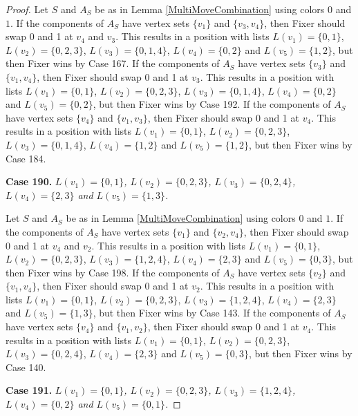 \documentclass[12pt]{amsart}
\theoremstyle{plain}
\theoremstyle{definition}
\theoremstyle{remark}
\begin{document}
\begin{proof}
Let $S$ and $A_S$ be as in Lemma \ref{MultiMoveCombination} using colors $0$ and $1$. If the components of $A_S$ have vertex sets $\{v_1\}$ and $\{v_3, v_4\}$, then Fixer should swap 0 and 1 at $v_4$ and $v_3$. This results in a position with lists $L(v_1) = \{0, 1\}$, $L(v_2) = \{0, 2, 3\}$, $L(v_3) = \{0, 1, 4\}$, $L(v_4) = \{0, 2\}$ and $L(v_5) = \{1, 2\}$, but then Fixer wins by Case 167.
If the components of $A_S$ have vertex sets $\{v_3\}$ and $\{v_1, v_4\}$, then Fixer should swap 0 and 1 at $v_3$. This results in a position with lists $L(v_1) = \{0, 1\}$, $L(v_2) = \{0, 2, 3\}$, $L(v_3) = \{0, 1, 4\}$, $L(v_4) = \{0, 2\}$ and $L(v_5) = \{0, 2\}$, but then Fixer wins by Case 192.
If the components of $A_S$ have vertex sets $\{v_4\}$ and $\{v_1, v_3\}$, then Fixer should swap 0 and 1 at $v_4$. This results in a position with lists $L(v_1) = \{0, 1\}$, $L(v_2) = \{0, 2, 3\}$, $L(v_3) = \{0, 1, 4\}$, $L(v_4) = \{1, 2\}$ and $L(v_5) = \{1, 2\}$, but then Fixer wins by Case 184.

\noindent\textbf{Case 190.  }\textit{$L(v_1) = \{0, 1\}$, $L(v_2) = \{0, 2, 3\}$, $L(v_3) = \{0, 2, 4\}$, $L(v_4) = \{2, 3\}$ and $L(v_5) = \{1, 3\}$.}

Let $S$ and $A_S$ be as in Lemma \ref{MultiMoveCombination} using colors $0$ and $1$. If the components of $A_S$ have vertex sets $\{v_1\}$ and $\{v_2, v_4\}$, then Fixer should swap 0 and 1 at $v_4$ and $v_2$. This results in a position with lists $L(v_1) = \{0, 1\}$, $L(v_2) = \{0, 2, 3\}$, $L(v_3) = \{1, 2, 4\}$, $L(v_4) = \{2, 3\}$ and $L(v_5) = \{0, 3\}$, but then Fixer wins by Case 198.
If the components of $A_S$ have vertex sets $\{v_2\}$ and $\{v_1, v_4\}$, then Fixer should swap 0 and 1 at $v_2$. This results in a position with lists $L(v_1) = \{0, 1\}$, $L(v_2) = \{0, 2, 3\}$, $L(v_3) = \{1, 2, 4\}$, $L(v_4) = \{2, 3\}$ and $L(v_5) = \{1, 3\}$, but then Fixer wins by Case 143.
If the components of $A_S$ have vertex sets $\{v_4\}$ and $\{v_1, v_2\}$, then Fixer should swap 0 and 1 at $v_4$. This results in a position with lists $L(v_1) = \{0, 1\}$, $L(v_2) = \{0, 2, 3\}$, $L(v_3) = \{0, 2, 4\}$, $L(v_4) = \{2, 3\}$ and $L(v_5) = \{0, 3\}$, but then Fixer wins by Case 140.

\noindent\textbf{Case 191.  }\textit{$L(v_1) = \{0, 1\}$, $L(v_2) = \{0, 2, 3\}$, $L(v_3) = \{1, 2, 4\}$, $L(v_4) = \{0, 2\}$ and $L(v_5) = \{0, 1\}$.}


\end{proof}
\end{document}
